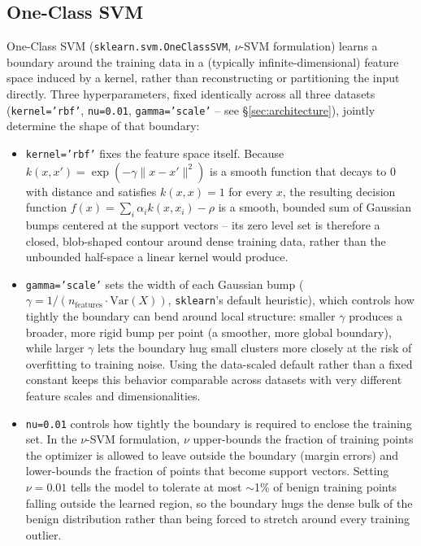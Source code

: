 \subsection{One-Class SVM}

One-Class SVM (\texttt{sklearn.svm.OneClassSVM}, $\nu$-SVM formulation) learns a boundary around the training data in a (typically infinite-dimensional) feature space induced by a kernel, rather than reconstructing or partitioning the input directly. Three hyperparameters, fixed identically across all three datasets (\texttt{kernel='rbf'}, \texttt{nu=0.01}, \texttt{gamma='scale'} -- see \S\ref{sec:architecture}), jointly determine the shape of that boundary:

\begin{itemize}
  \item \texttt{kernel='rbf'} fixes the feature space itself. Because $k(x,x') = \exp(-\gamma\lVert x-x'\rVert^2)$ is a smooth function that decays to 0 with distance and satisfies $k(x,x)=1$ for every $x$, the resulting decision function $f(x) = \sum_i \alpha_i k(x,x_i) - \rho$ is a smooth, bounded sum of Gaussian bumps centered at the support vectors -- its zero level set is therefore a closed, blob-shaped contour around dense training data, rather than the unbounded half-space a linear kernel would produce.
  \item \texttt{gamma='scale'} sets the width of each Gaussian bump ($\gamma = 1/(n_{\text{features}} \cdot \mathrm{Var}(X))$, \texttt{sklearn}'s default heuristic), which controls how tightly the boundary can bend around local structure: smaller $\gamma$ produces a broader, more rigid bump per point (a smoother, more global boundary), while larger $\gamma$ lets the boundary hug small clusters more closely at the risk of overfitting to training noise. Using the data-scaled default rather than a fixed constant keeps this behavior comparable across datasets with very different feature scales and dimensionalities.
  \item \texttt{nu=0.01} controls how tightly the boundary is required to enclose the training set. In the $\nu$-SVM formulation, $\nu$ upper-bounds the fraction of training points the optimizer is allowed to leave outside the boundary (margin errors) and lower-bounds the fraction of points that become support vectors. Setting $\nu=0.01$ tells the model to tolerate at most $\sim$1\% of benign training points falling outside the learned region, so the boundary hugs the dense bulk of the benign distribution rather than being forced to stretch around every training outlier.
\end{itemize}

